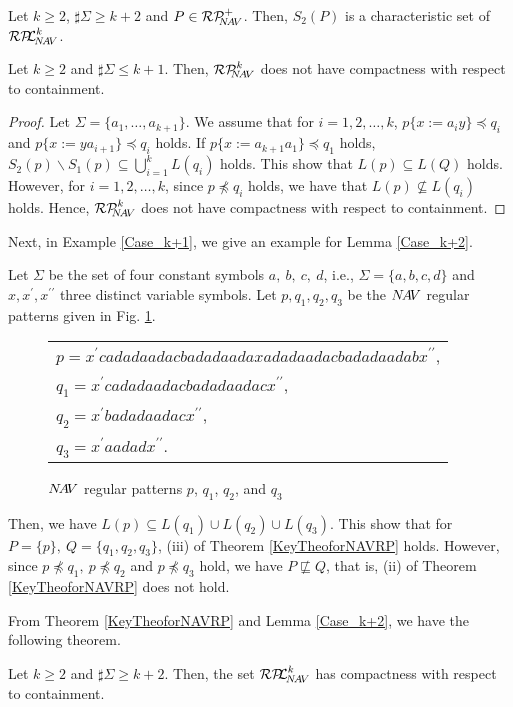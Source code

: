 \begin{col}
Let $k\ge 2$, $\sharp\Sigma \ge k+2$ and $P \in \mathcal{RP}^{+}_{\!\!\!N\!A\!V}$.
Then, $S_{2}(P)$ is a characteristic set of $\mathcal{RP\!\!L}^{k}_{\!N\!A\!V}$.
\end{col}

\begin{lem}\label{Case_k+2}
Let $k\ge 2$ and $\sharp\Sigma \le k+1$.
Then, $\mathcal{RP}^{k}_{\!\!\!N\!A\!V}$ does not have compactness with respect to containment.
\end{lem}
\begin{proof}
Let $\Sigma = \{ a_{1}, \ldots , a_{k+1} \}$.
We assume that for $i=1,2,\ldots,k$, $p \{ x := a_{i}y \} \preceq q_{i}$ and $p \{ x := ya_{i+1} \} \preceq q_{i}$ holds. 
If $p \{ x:= a_{k+1}a_{1} \} \preceq q_{1}$ holds, $S_{2}(p) \backslash S_{1}(p) \subseteq \bigcup^{k}_{i=1} L(q_{i})$ holds.
This show that $L(p) \subseteq L(Q)$ holds.
However, for $i=1,2,\ldots,k$, since $p \not \preceq q_{i}$ holds, we have that $L(p) \not \subseteq L(q_{i})$ holds.
Hence, $\mathcal{RP}^{k}_{\!\!\!N\!A\!V}$ does not have compactness with respect to containment.
\end{proof}

Next, in Example \ref{Case_k+1}, we give an example for Lemma \ref{Case_k+2}.
\begin{ex}\label{Case_k+1}
Let $\Sigma$ be the set of four constant symbols $a,~b,~c,~d$, i.e., $\Sigma= \{a, b, c, d \}$ and $x,x^{\prime},x^{\prime\prime}$ three distinct variable symbols.
Let $p,q_{1},q_{2},q_{3}$ be the $N\!A\!V$ regular patterns given in Fig. \ref{Fig:CounterExampleforNAVR}. 
\begin{figure}[tb]
  \begin{tabular}{l}
$p  = x^{\prime}cadadaadacbadadaadaxadadaadacbadadaadabx^{\prime\prime}$,\\
$q_{1} = x^{\prime}cadadaadacbadadaadacx^{\prime\prime}$,\\
$q_{2} = x^{\prime}badadaadacx^{\prime\prime}$,\\
$q_{3} = x^{\prime}aadadx^{\prime\prime}$.
  \end{tabular}
\caption{$N\!A\!V$ regular patterns $p$, $q_{1}$, $q_{2}$, and $q_{3}$}\label{Fig:CounterExampleforNAVR}
\end{figure}
\noindent
Then, we have  $L(p) \subseteq L(q_{1}) \cup L(q_{2}) \cup L(q_{3})$.
This show that for $P=\{p\},~Q=\{q_{1},q_{2},q_{3}\}$, (iii) of Theorem \ref{KeyTheoforNAVRP} holds.
However, since $p \not \preceq q_{1},~p \not \preceq q_{2}$ and $p \not \preceq q_{3}$ hold,
we have $P \not \sqsubseteq Q$, that is, (ii) of Theorem \ref{KeyTheoforNAVRP} does not hold.
\end{ex}

From Theorem \ref{KeyTheoforNAVRP} and Lemma \ref{Case_k+2}, 
we have the following theorem.

\begin{thm}\label{MainTheforNAVRP}
Let $k\ge 2$ and $\sharp\Sigma \ge k+2$.
Then, the set $\mathcal{RP\!\!L}^{k}_{\!N\!A\!V}$ has compactness with respect to containment.
\end{thm}